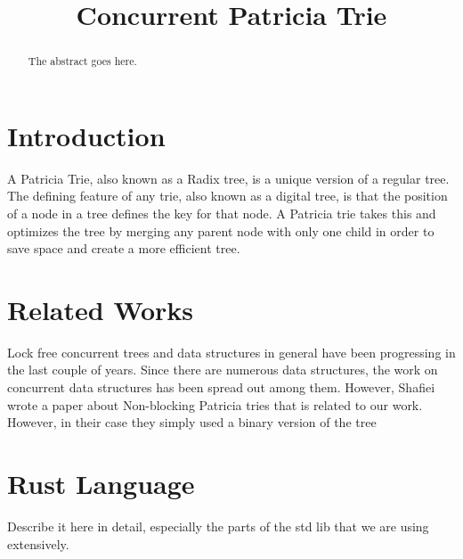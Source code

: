 \documentclass[conference]{IEEEtran}
\begin{document}
\title{Concurrent Patricia Trie}

\author{
\and
{}
}

\maketitle


\begin{abstract}
The abstract goes here.
\end{abstract}


\section{Introduction}
A Patricia Trie, also known as a Radix tree, is a unique version of a regular tree. The defining feature of any trie, also known
as a digital tree, is that the position of a node in a tree defines the key for that node. A Patricia trie takes this and optimizes the tree by 
merging any parent node with only one child in order to save space and create a more efficient tree.\cite{Shafiei2013} \par



\section{Related Works}
Lock free concurrent trees and data structures in general have been progressing in the last couple of years. \cite{Brown2014,Brown2013}
Since there are numerous data structures, the work on concurrent data structures has been spread out among them. However, Shafiei wrote
a paper about Non-blocking Patricia tries \cite{Shafiei2013} that is related to our work. However, in their case they simply used a binary version of the tree 


\section{Rust Language}
Describe it here in detail, especially the parts of the std lib that we are using extensively.
\end{document}
